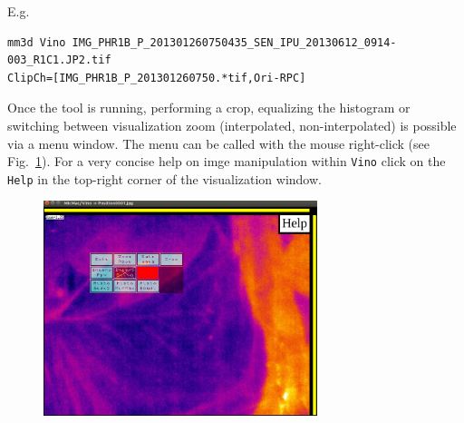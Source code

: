 \vspace{0.25cm}
\noindent
E.g. 
\begin{verbatim}
mm3d Vino IMG_PHR1B_P_201301260750435_SEN_IPU_20130612_0914-003_R1C1.JP2.tif
ClipCh=[IMG_PHR1B_P_201301260750.*tif,Ori-RPC]
\end{verbatim}
%
\vspace{0.5cm}
Once the tool is running, performing a crop, equalizing the histogram or switching between visualization zoom (interpolated, non-interpolated) is possible via a menu window. The menu can be called with the mouse right-click (see Fig.~\ref{FIG:Vino}). For a very concise help on imge manipulation within {\tt Vino} click on the {\tt Help} in the top-right corner of the visualization window.

\begin{figure}[H]
\begin{center}
\includegraphics[width=8cm]{FIGS/Vino/Vino_menu.png}
\end{center}
\label{FIG:Vino}
\end{figure}

